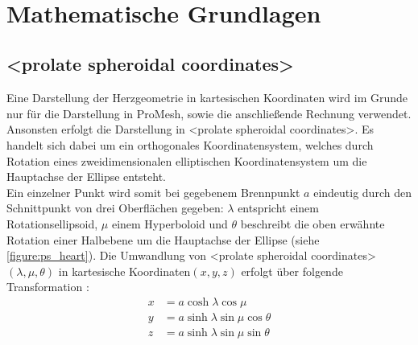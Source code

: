 \documentclass[
	a4paper,			%
	11pt,				%
	headsepline,		%
	bibtotoc,			%
	BCOR18mm,      		%
	DIV14,				%
	headings=normal,
	numbers=noenddot,
]{scrbook}
\theoremstyle{mythmstyle}
\theoremstyle{other}
\begin{document}
	\cite{gap_junction}\\
	 
	
	
	\clearpage
	\section{Mathematische Grundlagen}
	\subsection{<prolate spheroidal coordinates>}\label{subsec:prolate_spheroidal_cordinates}
	
		Eine Darstellung der Herzgeometrie in kartesischen Koordinaten wird
		im Grunde nur für die Darstellung in ProMesh, sowie die anschließende
		Rechnung verwendet. Ansonsten erfolgt die Darstellung in 
		<prolate spheroidal coordinates>. Es handelt sich dabei um ein orthogonales
		Koordinatensystem, welches durch Rotation eines zweidimensionalen 
		elliptischen Koordinatensystem um die Hauptachse der Ellipse entsteht. \\
		Ein einzelner Punkt wird somit bei gegebenem Brennpunkt $a$
		 eindeutig durch den Schnittpunkt von drei Oberflächen gegeben: 
		 $\lambda$ entspricht einem Rotationsellipsoid,
		$\mu$ einem Hyperboloid
		und  $\theta$ beschreibt die oben erwähnte Rotation einer Halbebene um
		die Hauptachse der Ellipse (siehe \autoref{figure:ps_heart}).
		Die Umwandlung von <prolate spheroidal coordinates>$(\lambda,
		\mu , \theta)$ in kartesische Koordinaten$(x,y,z)$ erfolgt über folgende
		Transformation \cite{paper1}:\\
			\begin{equation}\label{eq:ps_to_euc}
			\begin{split}
			x &=  a \cosh{\lambda}\cos{\mu}\\
		y &= a \sinh{\lambda}\sin{\mu}\cos{\theta}\\
		z &= a \sinh{\lambda}\sin{\mu}\sin{\theta}
			\end{split}
			\end{equation}
			
\end{document}
